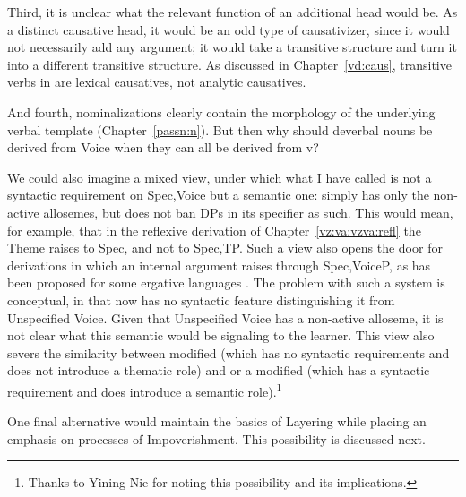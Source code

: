 Third, it is unclear what the relevant function of an additional head would be. As a  distinct causative head, it would be an odd type of causativizer, since it would not necessarily add any argument; it would take a transitive structure and turn it into a different transitive structure. As discussed in Chapter~\ref{vd:caus}, transitive verbs in {\thif} are lexical causatives, not analytic causatives.

And fourth, nominalizations clearly contain the morphology of the underlying verbal template (Chapter~\ref{passn:n}). But then why should deverbal nouns be derived from Voice when they can all be derived from v?

We could also imagine a mixed view, under which what I have called {\vz} is not a syntactic requirement on Spec,Voice but a semantic one: {\vz} simply has only the non-active allosemes, but does not ban DPs in its specifier as such. This would mean, for example, that in the reflexive derivation of Chapter~\ref{vz:va:vzva:refl} the Theme raises to Spec,{\vz} and not to Spec,TP. Such a view also opens the door for derivations in which an internal argument raises through Spec,VoiceP, as has been proposed for some ergative languages \citep{deal19li}. The problem with such a system is conceptual, in that {\vz} now has no syntactic feature distinguishing it from Unspecified Voice. Given that Unspecified Voice has a non-active alloseme, it is not clear what this semantic {\vz} would be signaling to the learner. This view also severs the similarity between modified {\vz} (which has no syntactic requirements and does not introduce a thematic role) and {\pz} or a modified {\pz} (which has a syntactic requirement and does introduce a semantic role).\footnote{Thanks to Yining Nie for noting this possibility and its implications.}

One final alternative would maintain the basics of Layering while placing an emphasis on processes of Impoverishment. This possibility is discussed next.



